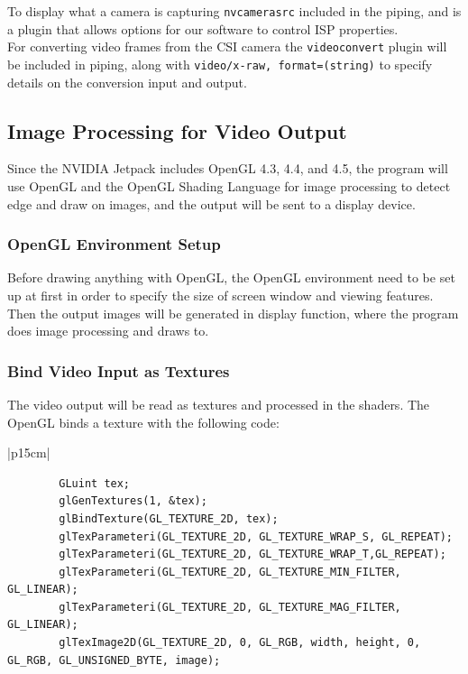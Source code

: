 \documentclass[letterpaper,10pt,serif,draftclsnofoot,onecolumn,compsoc,titlepage]{IEEEtran}
\begin{document}
To display what a camera is capturing \texttt{nvcamerasrc} included in the piping, 
and is a plugin that allows options for our software to control ISP properties. \\

For converting video frames from the CSI camera the \texttt{videoconvert} plugin will 
be included in piping, along with \texttt{video/x-raw, format=(string){}} to specify 
details on the conversion input and output. \\

\subsection{Image Processing for Video Output}

Since the  NVIDIA Jetpack includes OpenGL 4.3, 4.4, and 4.5, the program will use 
OpenGL and the OpenGL Shading Language for image processing to detect edge and draw on 
images, and the output will be sent to a display device. \\

\subsubsection{OpenGL Environment Setup}

Before drawing anything with OpenGL, the OpenGL environment need to be set up at first 
in order to specify the size of screen window and viewing features. Then the output 
images will be generated in display function, where the program does image processing 
and draws to. \\

\subsubsection{Bind Video Input as Textures}

The video output will be read as textures and processed in the shaders. The OpenGL 
binds a texture with the following code:\\

\begin{tabular}{|p{15cm}|}
	\begin{lstlisting}
		GLuint tex;
		glGenTextures(1, &tex);
		glBindTexture(GL_TEXTURE_2D, tex);
		glTexParameteri(GL_TEXTURE_2D, GL_TEXTURE_WRAP_S, GL_REPEAT);
		glTexParameteri(GL_TEXTURE_2D, GL_TEXTURE_WRAP_T,GL_REPEAT);
		glTexParameteri(GL_TEXTURE_2D, GL_TEXTURE_MIN_FILTER, GL_LINEAR);
		glTexParameteri(GL_TEXTURE_2D, GL_TEXTURE_MAG_FILTER, GL_LINEAR);
		glTexImage2D(GL_TEXTURE_2D, 0, GL_RGB, width, height, 0, GL_RGB, GL_UNSIGNED_BYTE, image);
	\end{lstlisting}
\end{tabular}
\end{document}
